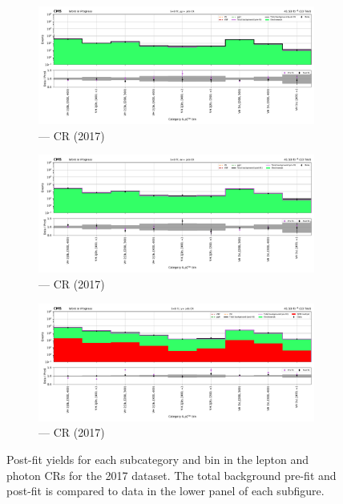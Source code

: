 \begin{figure}[htbp]
    \begin{subfigure}[b]{0.49\textwidth}
        \includegraphics[width=\textwidth]{chapters/higgstoinv/figures/mountain_ranges/2017/VH/Zmumu_tree_fit_s-abs_values_VH_cats.pdf}
        \caption{\VH --- \doubleMuCr \gls{CR} (2017)}
    \end{subfigure}
    \hfill
    \begin{subfigure}[b]{0.49\textwidth}
        \includegraphics[width=\textwidth]{chapters/higgstoinv/figures/mountain_ranges/2017/VH/Zee_tree_fit_s-abs_values_VH_cats.pdf}
        \caption{\VH --- \doubleEleCr \gls{CR} (2017)}
    \end{subfigure}

    \begin{subfigure}[b]{0.49\textwidth}
        \includegraphics[width=\textwidth]{chapters/higgstoinv/figures/mountain_ranges/2017/VH/Photon_tree_fit_s-abs_values_VH_cats.pdf}
        \caption{\VH --- \singlePhotonCr \gls{CR} (2017)}
    \end{subfigure}
    \caption[Post-fit yields for each \VH subcategory and \ptmiss bin in the lepton and photon control regions for the 2017 dataset]{Post-fit yields for each \VH subcategory and \ptmiss bin in the lepton and photon \glspl{CR} for the 2017 dataset. The total background pre-fit and post-fit is compared to data in the lower panel of each subfigure.}
    \label{fig:htoinv_mountain_range_VH_2017_CRs}
\end{figure}

